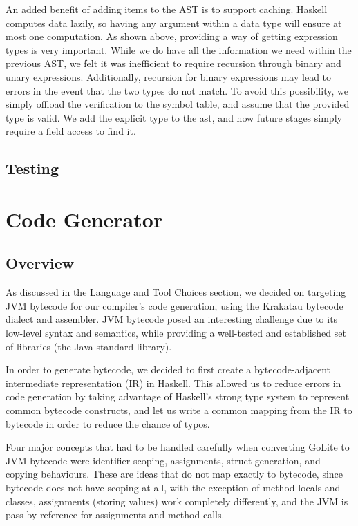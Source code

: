 \documentclass[11pt]{article}
\begin{document}
An added benefit of adding items to the AST is to support caching.
Haskell computes data lazily, so having any argument within a
data type will ensure at most one computation.
As shown above, providing a way of getting expression types is very important. While we do have all the information we need within the previous AST,
we felt it was inefficient to require recursion through binary and unary expressions.
Additionally, recursion for binary expressions may lead to errors in the
event that the two types do not match. To avoid this possibility,
we simply offload the verification to the symbol table, and assume that the provided type is valid.
We add the explicit type to the ast, and now future stages simply require
a field access to find it.

\subsection{Testing} %

\section{Code Generator}
\subsection{Overview}

As discussed in the Language and Tool Choices section, we decided on targeting
JVM bytecode for our compiler's code generation, using the Krakatau bytecode
dialect and assembler. JVM bytecode posed an interesting challenge due to its
low-level syntax and semantics, while providing a well-tested and established
set of libraries (the Java standard library).

In order to generate bytecode, we decided to first create a bytecode-adjacent
intermediate representation (IR) in Haskell. This allowed us to reduce errors
in code generation by taking advantage of Haskell's strong type system to
represent common bytecode constructs, and let us write a common mapping from
the IR to bytecode in order to reduce the chance of typos.

Four major concepts that had to be handled carefully when converting GoLite to
JVM bytecode were identifier scoping, assignments, struct generation, and copying
behaviours. These are ideas that do not map exactly to bytecode, since bytecode
does not have scoping at all, with the exception of method locals and classes,
assignments (storing values) work completely differently, and the JVM is
pass-by-reference for assignments and method calls.
\end{document}
